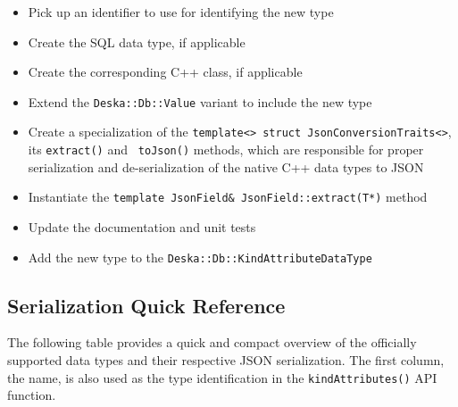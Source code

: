 \documentclass[deska]{subfiles}
\begin{document}
\begin{itemize}
    \item Pick up an identifier to use for identifying the new type
    \item Create the SQL data type, if applicable
    \item Create the corresponding C++ class, if applicable
    \item Extend the {\tt Deska::Db::Value} variant to include the new type
    \item Create a specialization of the {\tt template<> struct JsonConversionTraits<>}, its {\tt extract()} and {\tt
        toJson()} methods, which are responsible for proper serialization and de-serialization of the native C++ data
        types to JSON
    \item Instantiate the {\tt template JsonField\& JsonField::extract(T*)} method
    \item Update the documentation and unit tests
    \item Add the new type to the {\tt Deska::Db::KindAttributeDataType}
\end{itemize}

\subsection{Serialization Quick Reference}
\label{sec:json-data-types-reference}

The following table provides a quick and compact overview of the officially supported data types and their respective
JSON serialization.  The first column, the name, is also used as the type identification in the {\tt kindAttributes()}
API function.
\end{document}
